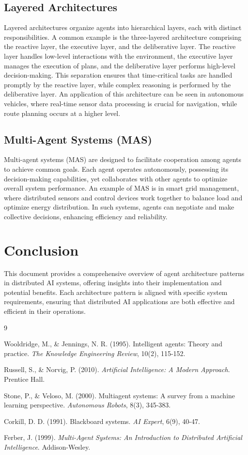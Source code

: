 \documentclass{article}
\begin{document}
\subsection{Layered Architectures}
Layered architectures organize agents into hierarchical layers, each with distinct responsibilities. A common example is the three-layered architecture comprising the reactive layer, the executive layer, and the deliberative layer. The reactive layer handles low-level interactions with the environment, the executive layer manages the execution of plans, and the deliberative layer performs high-level decision-making. This separation ensures that time-critical tasks are handled promptly by the reactive layer, while complex reasoning is performed by the deliberative layer. An application of this architecture can be seen in autonomous vehicles, where real-time sensor data processing is crucial for navigation, while route planning occurs at a higher level.

\subsection{Multi-Agent Systems (MAS)}
Multi-agent systems (MAS) are designed to facilitate cooperation among agents to achieve common goals. Each agent operates autonomously, possessing its decision-making capabilities, yet collaborates with other agents to optimize overall system performance. An example of MAS is in smart grid management, where distributed sensors and control devices work together to balance load and optimize energy distribution. In such systems, agents can negotiate and make collective decisions, enhancing efficiency and reliability.

\section{Conclusion}
This document provides a comprehensive overview of agent architecture patterns in distributed AI systems, offering insights into their implementation and potential benefits. Each architecture pattern is aligned with specific system requirements, ensuring that distributed AI applications are both effective and efficient in their operations.

\begin{thebibliography}{9}

Wooldridge, M., \& Jennings, N. R. (1995). Intelligent agents: Theory and practice. \textit{The Knowledge Engineering Review}, 10(2), 115-152.

Russell, S., \& Norvig, P. (2010). \textit{Artificial Intelligence: A Modern Approach}. Prentice Hall.

Stone, P., \& Veloso, M. (2000). Multiagent systems: A survey from a machine learning perspective. \textit{Autonomous Robots}, 8(3), 345-383.

Corkill, D. D. (1991). Blackboard systems. \textit{AI Expert}, 6(9), 40-47.

Ferber, J. (1999). \textit{Multi-Agent Systems: An Introduction to Distributed Artificial Intelligence}. Addison-Wesley.

\end{thebibliography}
\end{document}
